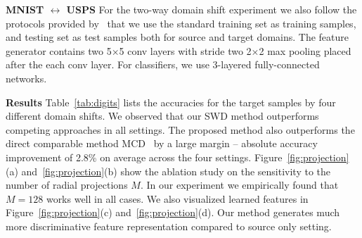 \documentclass[10pt,twocolumn,letterpaper]{article}
\begin{document}
\vspace{2mm}
\noindent \textbf{MNIST $\leftrightarrow$ USPS}
For the two-way domain shift experiment we also follow the protocols provided by~\cite{saito2017maximum} that we use the standard training set as training samples, and testing set as test samples both for source and target domains. The feature generator contains two 5$\times$5 conv layers with stride two 2$\times$2 max pooling placed after the each conv layer. For classifiers, we use 3-layered fully-connected networks. 


\vspace{2mm}
\noindent \textbf{Results}
Table~\ref{tab:digits} lists the accuracies for the target samples by four different domain shifts. We observed that our SWD method outperforms competing approaches in all settings. The proposed method also outperforms the direct comparable method MCD~\cite{saito2017maximum} by a large margin -- absolute accuracy improvement of 2.8\% on average across the four settings. Figure~\ref{fig:projection}(a) and~\ref{fig:projection}(b) show the ablation study on the sensitivity to the number of radial projections $M$. In our experiment we empirically found that $M=128$ works well in all cases. We also visualized learned features in Figure~\ref{fig:projection}(c) and~\ref{fig:projection}(d). Our method generates much more discriminative feature representation compared to source only setting.
\end{document}
